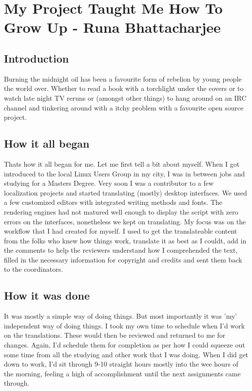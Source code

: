\chapter{My Project Taught Me How To Grow Up - Runa Bhattacharjee}
\section*{Introduction}

Burning the midnight oil has been a favourite form of rebelion by young people the world over. Whether to read a book with a torchlight under the covers or to watch late night TV reruns or (amongst other things) to hang around on an IRC channel and tinkering around with a itchy problem with a favourite open source project. 

\section*{How it all began}

Thats how it all began for me. Let me first tell a bit about myself. When I got introduced to the local Linux Users Group in my city, I was in between jobs and studying for a Masters Degree. Very soon I was a contributor to a few localization projects and started translating (mostly) desktop interfaces. We used a few customized editors with integrated writing methods and fonts. The rendering engines had not matured well enough to display the script with zero errors on the interfaces, nonetheless we kept on translating. My focus was on the workflow that I had created for myself. I used to get the translateable content from the folks who knew how things work, translate it as best as I couldt, add in the comments to help the reviewers understand how I comprehended the text, filled in the necessary information for  copyright and credits and sent them back to the coordinators.

\section*{How it was done}

It was mostly a simple way of doing things. But most importantly it was 'my' independent way of doing things. I took my own time to schedule when I'd work on the translations. These would then be reviewed and returned to me for changes. Again, I'd schedule them for completion as per how I could squeeze out some time from all the studying and other work that I was doing. When I did get down to work, I'd sit through 9-10 straight hours mostly into the wee hours of the morning, feeling a high of accomplishment until the next assignments came through.

